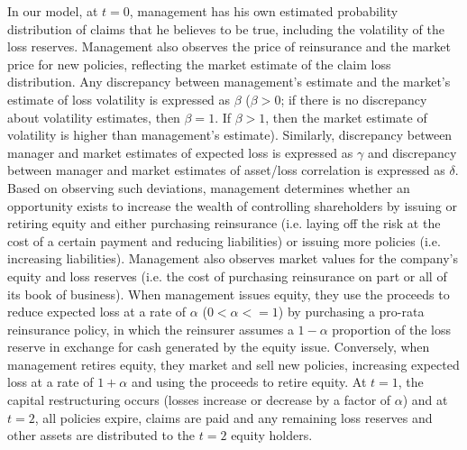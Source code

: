 In our model, at $t=0$, management has his own estimated probability distribution of claims that he believes to be true, including the volatility of the loss reserves. Management also observes the price of reinsurance and the market price for new policies, reflecting the market estimate of the claim loss distribution.  Any discrepancy between management's estimate and the market's estimate of loss volatility is expressed as $\beta$ ($\beta>0$; if there is no discrepancy about volatility estimates, then $\beta=1$. If $\beta>1$, then the market estimate of volatility is higher than management's estimate). Similarly, discrepancy between manager and market estimates of expected loss is expressed as $\gamma$ and discrepancy between manager and market estimates of asset/loss correlation is expressed as $\delta$. Based on observing such deviations, management determines whether an opportunity exists to increase the wealth of controlling shareholders by issuing or retiring equity and either purchasing reinsurance (i.e. laying off the risk at the cost of a certain payment and reducing liabilities) or issuing more policies (i.e. increasing liabilities). Management also observes market values for the company's equity and loss reserves (i.e. the cost of purchasing reinsurance on part or all of its book of business).  When management issues equity, they use the proceeds to reduce expected loss at a rate of $\alpha$ ($0<\alpha<=1$) by purchasing a pro-rata reinsurance policy, in which the reinsurer assumes a $1-\alpha$ proportion of the loss reserve in exchange for cash generated by the equity issue.  Conversely, when management retires equity, they market and sell new policies, increasing expected loss at a rate of $1+\alpha$ and using the proceeds to retire equity. At $t=1$, the capital restructuring occurs (losses increase or decrease by a factor of $\alpha$) and at $t=2$, all policies expire, claims are paid and any remaining loss reserves and other assets are distributed to the $t=2$ equity holders.

